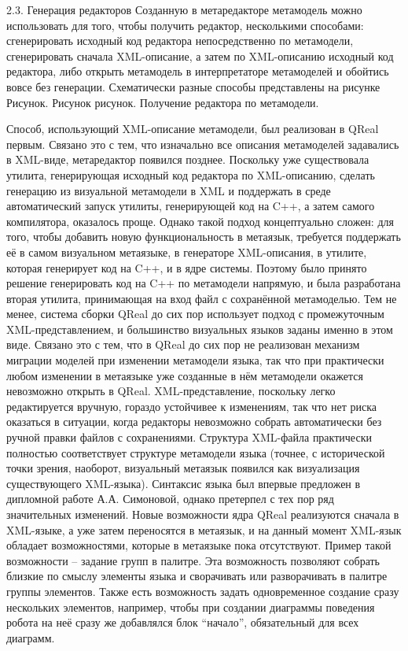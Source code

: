 2.3. Генерация редакторов
	Созданную в метаредакторе метамодель можно использовать для того, чтобы получить редактор, несколькими способами: сгенерировать исходный код редактора непосредственно по метамодели, сгенерировать сначала XML-описание, а затем по XML-описанию исходный код редактора, либо открыть метамодель в интерпретаторе метамоделей и обойтись вовсе без генерации. Схематически разные способы представлены на рисунке Рисунок.
Рисунок рисунок. Получение редактора по метамодели.

Способ, использующий XML-описание метамодели, был реализован в QReal первым. Связано это с тем, что изначально все описания метамоделей задавались в XML-виде, метаредактор появился позднее. Поскольку уже существовала утилита, генерирующая исходный код редактора по XML-описанию, сделать генерацию из визуальной метамодели в XML и поддержать в среде автоматический запуск утилиты, генерирующей код на C++, а затем самого компилятора, оказалось проще. Однако такой подход концептуально сложен: для того, чтобы добавить новую функциональность в метаязык, требуется поддержать её в самом визуальном метаязыке, в генераторе XML-описания, в утилите, которая генерирует код на C++, и в ядре системы. Поэтому было принято решение генерировать код на C++ по метамодели напрямую, и была разработана вторая утилита,  принимающая на вход файл с сохранённой метамоделью. Тем не менее, система сборки QReal до сих пор использует подход с промежуточным XML-представлением, и большинство визуальных языков заданы именно в этом виде. Связано это с тем, что в QReal до сих пор не реализован механизм миграции моделей при изменении метамодели языка, так что при практически любом изменении в метаязыке уже созданные в нём метамодели окажется невозможно открыть в QReal. XML-представление, поскольку легко редактируется вручную, гораздо устойчивее к изменениям, так что нет риска оказаться в ситуации, когда редакторы невозможно собрать автоматически без ручной правки файлов с сохранениями. 
	Структура XML-файла практически полностью соответствует структуре метамодели языка (точнее, с исторической точки зрения, наоборот, визуальный метаязык появился как визуализация существующего XML-языка). Синтаксис языка был впервые предложен в дипломной работе А.А. Симоновой, однако претерпел с тех пор ряд значительных изменений. Новые возможности ядра QReal реализуются сначала в XML-языке, а уже затем переносятся в метаязык, и на данный момент XML-язык обладает возможностями, которые в метаязыке пока отсутствуют. Пример такой возможности – задание групп в палитре. Эта возможность позволяют собрать близкие по смыслу элементы языка и сворачивать или разворачивать в палитре группы элементов. Также есть возможность задать одновременное создание сразу нескольких элементов, например, чтобы при создании диаграммы поведения робота на неё сразу же добавлялся блок “начало”, обязательный для всех диаграмм.
